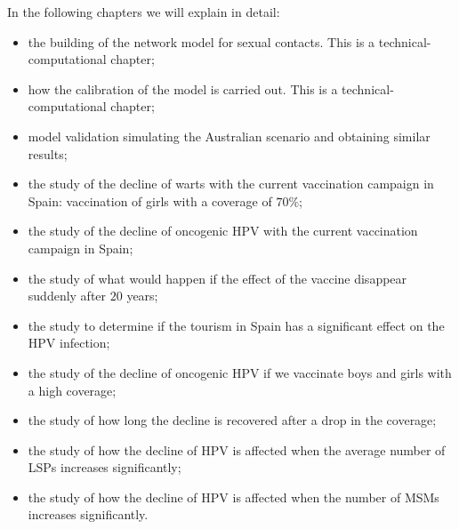 In the following chapters we will explain in detail: 
\begin{itemize}
	\item the building of the network model for sexual contacts. This is a technical-computational chapter;
	\item how the calibration of the model is carried out. This is a technical-computational chapter;
	\item model validation simulating the Australian scenario and obtaining similar results;
	\item the study of the decline of warts with the current vaccination campaign in Spain: vaccination of girls with a coverage of $70\%$;
	\item the study of the decline of oncogenic HPV with the current vaccination campaign in Spain;
	\item the study of what would happen if the effect of the vaccine disappear suddenly after $20$ years;
	\item the study to determine if the tourism in Spain has a significant effect on the HPV infection;
	\item the study of the decline of oncogenic HPV if we vaccinate boys and girls with a high coverage;
	\item the study of how long the decline is recovered after a drop in the coverage;
	\item the study of how the decline of HPV is affected when the average number of LSPs increases significantly;
	\item the study of how the decline of HPV is affected when the number of MSMs increases significantly.
\end{itemize}


